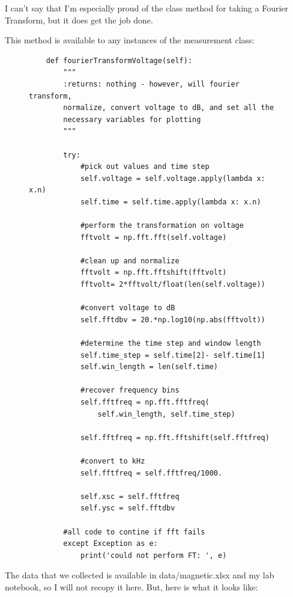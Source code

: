 \documentclass{article}
\begin{document}
I can't say that I'm especially proud of the class method for taking a Fourier
Transform, but it does get the job done. 

This method is available to any instances of the measurement class:
\begin{figure}[H]
\centering
\begin{minipage}{1\textwidth}
\begin{tcolorbox}
\begin{verbatim}
    def fourierTransformVoltage(self):
        """
        :returns: nothing - however, will fourier transform, 
        normalize, convert voltage to dB, and set all the 
        necessary variables for plotting
        """

        try:
            #pick out values and time step
            self.voltage = self.voltage.apply(lambda x: x.n)
            self.time = self.time.apply(lambda x: x.n)

            #perform the transformation on voltage
            fftvolt = np.fft.fft(self.voltage)

            #clean up and normalize
            fftvolt = np.fft.fftshift(fftvolt)
            fftvolt= 2*fftvolt/float(len(self.voltage))

            #convert voltage to dB
            self.fftdbv = 20.*np.log10(np.abs(fftvolt))

            #determine the time step and window length
            self.time_step = self.time[2]- self.time[1]
            self.win_length = len(self.time)

            #recover frequency bins
            self.fftfreq = np.fft.fftfreq(
                self.win_length, self.time_step)

            self.fftfreq = np.fft.fftshift(self.fftfreq)

            #convert to kHz
            self.fftfreq = self.fftfreq/1000.

            self.xsc = self.fftfreq
            self.ysc = self.fftdbv

        #all code to contine if fft fails
        except Exception as e:
            print('could not perform FT: ', e)
\end{verbatim}
\end{tcolorbox}
\end{minipage}
\end{figure}




The data that we collected is available in data/magnetic.xlsx 
and my lab notebook, so I will not recopy it here. But, here is what it looks
like:
\end{document}

